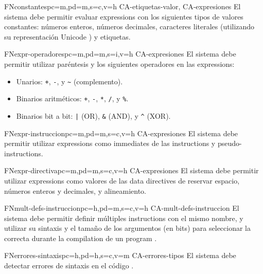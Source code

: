 \begin{softwareReq}{FN}{constantes}{pc=m,pd=m,s=c,v=h}
    {CA-etiquetas-valor, CA-expresiones}
    El sistema debe permitir evaluar \glspl{expression} con los siguientes tipos
    de valores constantes: números enteros, números decimales, caracteres
    literales (utilizando su representación Unicode \parencite{UTF-8}) y etiquetas.
\end{softwareReq}

\begin{softwareReq}{FN}{expr-operadores}{pc=m,pd=m,s=i,v=h}
    {CA-expresiones}
    El sistema debe permitir utilizar paréntesis y los siguientes operadores en
    las \glspl{expression}:
    \begin{itemize}
        \item Unarios: \verb!+!, \verb!-!, y \verb!~! (complemento).
        \item Binarios aritméticos: \verb!+!, \verb!-!, \verb!*!, \verb!/!, y \verb!%!.
        \item Binarios bit a bit: \verb!|! (OR), \verb!&! (AND), y \verb!^! (XOR).
    \end{itemize}
\end{softwareReq}

\begin{softwareReq}{FN}{expr-instruccion}{pc=m,pd=m,s=c,v=h}
    {CA-expresiones}
    El sistema debe permitir utilizar \glspl{expression} como \glspl{immediate}
    de las \glspl{instruction} y \glspl{pseudo-instruction}.
\end{softwareReq}

\begin{softwareReq}{FN}{expr-directiva}{pc=m,pd=m,s=c,v=h}
    {CA-expresiones}
    El sistema debe permitir utilizar \glspl{expression} como valores de las
    \glspl{data directive} de reservar espacio, números enteros y decimales, y
    alineamiento.
\end{softwareReq}

\begin{softwareReq}{FN}{mult-defs-instruccion}{pc=h,pd=m,s=c,v=h}
    {CA-mult-defs-instruccion}
    El sistema debe permitir definir múltiples \glspl{instruction} con el mismo
    nombre, y utilizar su sintaxis y el tamaño de los argumentos (en bits) para
    seleccionar la correcta durante la \gls{compilation} de un \gls{program}
    .
\end{softwareReq}

\begin{softwareReq}{FN}{errores-sintaxis}{pc=h,pd=h,s=c,v=m}
    {CA-errores-tipos}
    El sistema debe detectar errores de sintaxis en el código .
\end{softwareReq}

